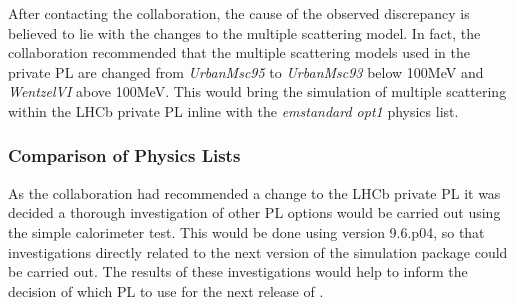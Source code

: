 After contacting the \geant collaboration, the cause of the observed discrepancy is believed to lie with the changes to the multiple scattering model.  In fact, the \geant collaboration recommended that the multiple scattering models used in the \lhcb private PL are changed from \textit{UrbanMsc95} to \textit{UrbanMsc93} below 100MeV and \textit{WentzelVI} above 100MeV.  This would bring the simulation of multiple scattering within the LHCb private PL inline with the \geant \textit{emstandard opt1} physics list.
\clearpage
\subsubsection{Comparison of Physics Lists}
\label{sec:Comaprison of PL}
As the \geant collaboration had recommended a change to the LHCb private PL it was decided a thorough investigation of other PL options would be carried out using the simple calorimeter test.  This would be done using \geant version 9.6.p04, so that investigations directly related to the next version of the \lhcb simulation package could be carried out.  The results of these investigations would help to inform the decision of which PL to use for the next release of \gauss.  

